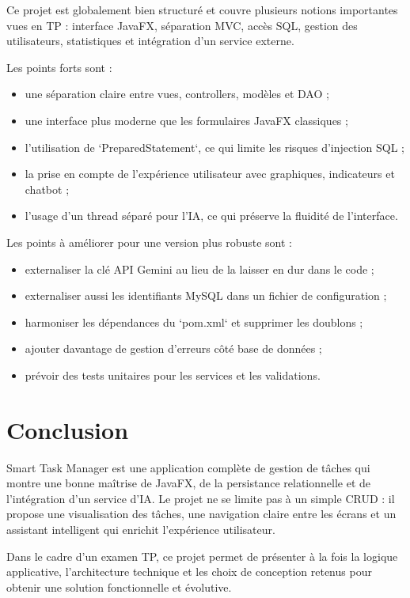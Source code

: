 \documentclass[11pt,a4paper]{article}
\begin{document}
Ce projet est globalement bien structuré et couvre plusieurs notions importantes vues en TP : interface JavaFX, séparation MVC, accès SQL, gestion des utilisateurs, statistiques et intégration d'un service externe.

Les points forts sont :
\begin{itemize}[leftmargin=1.4em]
    \item une séparation claire entre vues, controllers, modèles et DAO ;
    \item une interface plus moderne que les formulaires JavaFX classiques ;
    \item l'utilisation de `PreparedStatement`, ce qui limite les risques d'injection SQL ;
    \item la prise en compte de l'expérience utilisateur avec graphiques, indicateurs et chatbot ;
    \item l'usage d'un thread séparé pour l'IA, ce qui préserve la fluidité de l'interface.
\end{itemize}

Les points à améliorer pour une version plus robuste sont :
\begin{itemize}[leftmargin=1.4em]
    \item externaliser la clé API Gemini au lieu de la laisser en dur dans le code ;
    \item externaliser aussi les identifiants MySQL dans un fichier de configuration ;
    \item harmoniser les dépendances du `pom.xml` et supprimer les doublons ;
    \item ajouter davantage de gestion d'erreurs côté base de données ;
    \item prévoir des tests unitaires pour les services et les validations.
\end{itemize}

\section{Conclusion}

Smart Task Manager est une application complète de gestion de tâches qui montre une bonne maîtrise de JavaFX, de la persistance relationnelle et de l'intégration d'un service d'IA. Le projet ne se limite pas à un simple CRUD : il propose une visualisation des tâches, une navigation claire entre les écrans et un assistant intelligent qui enrichit l'expérience utilisateur.

Dans le cadre d'un examen TP, ce projet permet de présenter à la fois la logique applicative, l'architecture technique et les choix de conception retenus pour obtenir une solution fonctionnelle et évolutive.
\end{document}
